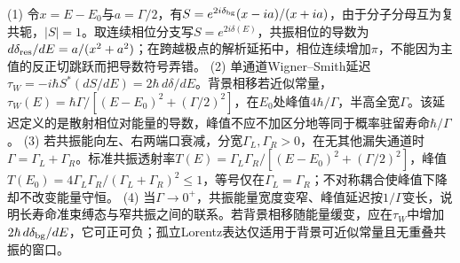 (1) 令\(x=E-E_0\)与\(a=\Gamma/2\)，有\(S=e^{2i\delta_{\rm bg}}(x-ia)/(x+ia)\)，由于分子分母互为复共轭，\(|S|=1\)。取连续相位分支写\(S=e^{2i\delta(E)}\)，共振相位的导数为\(d\delta_{\rm res}/dE=a/(x^2+a^2)\)；在跨越极点的解析延拓中，相位连续增加\(\pi\)，不能因为主值的反正切跳跃而把导数符号弄错。
(2) 单通道Wigner–Smith延迟\(\tau_W=-i\hbar S^*(dS/dE)=2\hbar\,d\delta/dE\)。背景相移若近似常量，\(\tau_W(E)=\hbar\Gamma/[(E-E_0)^2+(\Gamma/2)^2]\)，在\(E_0\)处峰值\(4\hbar/\Gamma\)，半高全宽\(\Gamma\)。该延迟定义的是散射相位对能量的导数，峰值不应不加区分地等同于概率驻留寿命\(\hbar/\Gamma\)。
(3) 若共振能向左、右两端口衰减，分宽\(\Gamma_L,\Gamma_R>0\)，在无其他漏失通道时\(\Gamma=\Gamma_L+\Gamma_R\)。标准共振透射率\(T(E)=\Gamma_L\Gamma_R/[(E-E_0)^2+(\Gamma/2)^2]\)，峰值\(T(E_0)=4\Gamma_L\Gamma_R/(\Gamma_L+\Gamma_R)^2\le1\)，等号仅在\(\Gamma_L=\Gamma_R\)；不对称耦合使峰值下降却不改变能量守恒。
(4) 当\(\Gamma\to0^+\)，共振能量宽度变窄、峰值延迟按\(1/\Gamma\)变长，说明长寿命准束缚态与窄共振之间的联系。若背景相移随能量缓变，应在\(\tau_W\)中增加\(2\hbar\,d\delta_{\rm bg}/dE\)，它可正可负；孤立Lorentz表达仅适用于背景可近似常量且无重叠共振的窗口。
